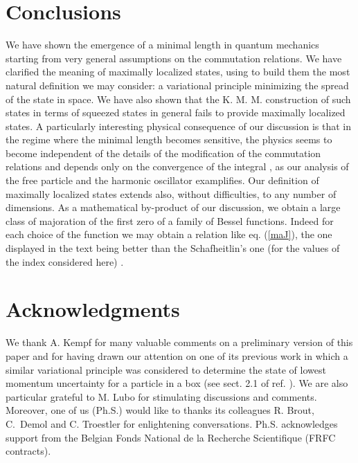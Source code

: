 \documentclass[a4paper,10pt]{article}
\providecommand{\cU}{{\cal U}}
\providecommand{\KMM}{K. M. M. }
\begin{document}
\section{Conclusions}
We have shown the emergence of a minimal length in quantum
mechanics starting from very general assumptions on the
commutation relations. We have clarified the meaning of maximally
localized states, using to build them the most natural definition
we may consider: a variational principle minimizing the spread of
the state in space. We have also shown that the \KMM construction
of such states in terms of squeezed states in general fails to
provide maximally localized states. A particularly interesting
physical consequence of our discussion is that in the regime where
the minimal length becomes sensitive, the physics seems to become
independent of the details of the modification of the commutation
relations and depends only on the convergence of the integral
\coordHE{}, as our analysis of the
free particle and the harmonic oscillator examplifies. Our
definition of maximally localized states extends also, without
difficulties, to any number of dimensions. As a mathematical
by-product of our discussion, we obtain a large class of
majoration of the first zero of a family of Bessel functions.
Indeed for each choice of the function \myHighlight{$\cU$}\coordHE{} we may obtain a
relation like eq. (\ref{maJ}), the one displayed in the text being
better than the Schafheitlin's one (for the values of the index
\myHighlight{$\nu$}\coordHE{} considered here) \cite{Wa}.
\section{Acknowledgments}
We thank A. Kempf for many valuable comments on a preliminary
version of this paper and for having drawn our attention on one of
its previous work in which a similar variational principle was
considered to determine the state of lowest momentum uncertainty
for a particle in a box (see sect. 2.1 of ref. \cite{K6}). We are
also particular grateful to M. Lubo for stimulating discussions
and comments. Moreover, one of us (Ph.S.) would like to thanks its
colleagues R. Brout, C.~Demol and C. Troestler for enlightening
conversations. Ph.S. acknowledges support from the Belgian Fonds
National de la Recherche Scientifique (FRFC contracts).
\appendix
\end{document}

